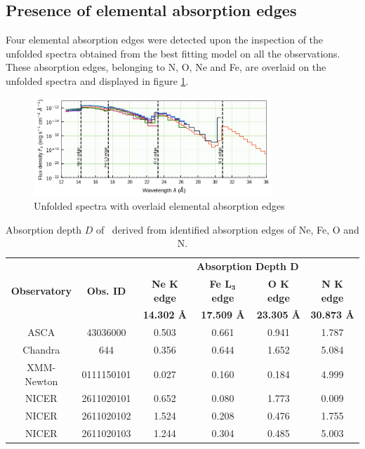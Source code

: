     \subsection{Presence of elemental absorption edges}
    Four elemental absorption edges were detected upon the inspection of the unfolded spectra obtained from the best fitting model on all the observations. These absorption edges, belonging to N, O, Ne and Fe, are overlaid on the unfolded spectra and displayed in figure \ref{fig:all-uf:abs-edges}.
    \begin{figure}[!htb]
        \centering
        \includegraphics[width=0.8\textwidth]{figures/eufspec/mr-vel-uf-ang_abs-edge.png}
        \caption{Unfolded spectra with overlaid elemental absorption edges}
        \label{fig:all-uf:abs-edges}
    \end{figure}
    
    \begin{table}[!htb]
    	\centering
    	\caption{Absorption depth $D$ of \source\ derived from identified absorption edges of Ne, Fe, O and N.}
    	\label{tab:abs-depth}
		\begin{tabular}{cccccc}
			\hline
			\multirow{3}{*}{\textbf{Observatory}} & \multirow{3}{*}{\textbf{Obs. ID}} & \multicolumn{4}{c}{\textbf{Absorption Depth $\boldsymbol{D}$}} \\ \cline{3-6} & & \textbf{Ne $\boldsymbol{K}$ edge} & \textbf{Fe $\boldsymbol{L_3}$ edge} & \textbf{O $\boldsymbol{K}$ edge} & \textbf{N $\boldsymbol{K}$ edge} \\ \cline{3-6} & & \textbf{14.302 \AA} & \textbf{17.509 \AA} & \textbf{23.305 \AA} & \textbf{30.873 \AA} \\
			\hline
			{ASCA} & {43036000} & {0.503} & {0.661} & {0.941} & {1.787} \\
			{Chandra} & {644} & {0.356} & {0.644} & {1.652} & {5.084} \\
			{XMM-Newton} & {0111150101} & {0.027} & {0.160} & {0.184} & {4.999} \\
			{NICER} & {2611020101} & {0.652} & {0.080} & {1.773} & {0.009} \\
			{NICER} & {2611020102} & {1.524} & {0.208} & {0.476} & {1.755} \\
			{NICER} & {2611020103} & {1.244} & {0.304} & {0.485} & {5.003} \\
			\hline
		\end{tabular}
	\end{table}

